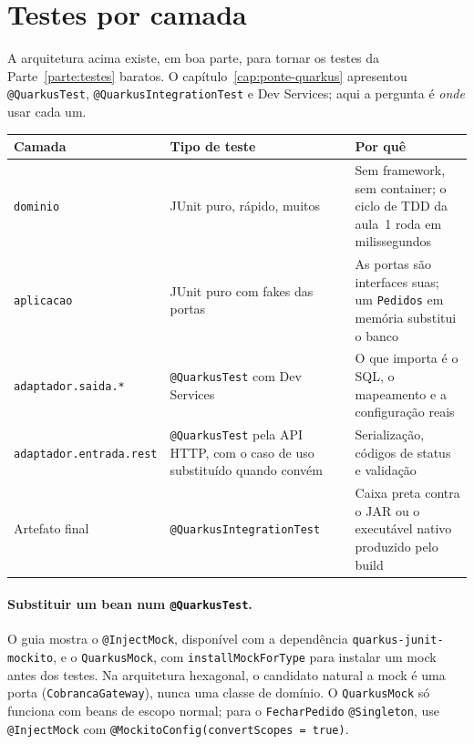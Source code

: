 \section{Testes por camada}
\label{sec:testes-camadas}

A arquitetura acima existe, em boa parte, para tornar os testes da
Parte~\ref{parte:testes} baratos. O capítulo~\ref{cap:ponte-quarkus} apresentou
\texttt{@QuarkusTest}, \texttt{@QuarkusIntegrationTest} e Dev Services;
aqui a pergunta é \emph{onde} usar cada um.

\small
\begin{longtable}{@{}p{3cm} p{4.2cm} p{5cm}@{}}
\toprule
Camada & Tipo de teste & Por quê \\
\midrule \endhead
\texttt{dominio} & JUnit puro, rápido, muitos & Sem framework, sem
  container; o ciclo de TDD da aula~1 roda em milissegundos \\
\texttt{aplicacao} & JUnit puro com fakes das portas & As portas são
  interfaces suas; um \texttt{Pedidos} em memória substitui o banco \\
\texttt{adaptador.\allowbreak saida.*} & \texttt{@QuarkusTest} com Dev Services &
  O que importa é o SQL, o mapeamento e a configuração reais \\
\texttt{adaptador.\allowbreak entrada.\allowbreak rest} & \texttt{@QuarkusTest} pela API HTTP,
  com o caso de uso substituído quando convém & Serialização, códigos de
  status e validação \\
Artefato final & \texttt{@QuarkusIntegrationTest} & Caixa preta contra o
  JAR ou o executável nativo produzido pelo build \\
\bottomrule
\end{longtable}
\normalsize

\paragraph{Substituir um bean num \texttt{@QuarkusTest}.}
O guia  mostra o \texttt{@InjectMock},
disponível com a dependência \texttt{quarkus-junit-mockito}, e o
\texttt{QuarkusMock}, com \texttt{installMockForType} para instalar um
mock antes dos testes. Na arquitetura hexagonal, o candidato natural a
mock é uma porta (\texttt{CobrancaGateway}), nunca uma classe de
domínio. O \texttt{QuarkusMock} só funciona com beans de escopo normal;
para o \texttt{FecharPedido} \texttt{@Singleton}, use \texttt{@InjectMock}
com \texttt{@MockitoConfig(convertScopes = true)}.

